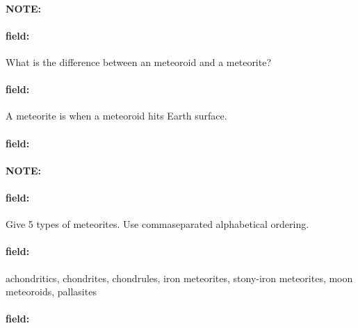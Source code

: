 \documentclass[12pt]{article}
\newenvironment{note}{\paragraph{NOTE:}}{}
\newenvironment{field}{\paragraph{field:}}{}
\begin{document}
\begin{note}
   \begin{field}
       What is the difference between an meteoroid and a meteorite?
   \end{field}
   \begin{field}
		A meteorite is when a meteoroid hits Earth surface.
   \end{field}
   \begin{field}
   \end{field}
\end{note}

\begin{note}
   \begin{field}
       Give 5 types of meteorites. Use commaseparated alphabetical ordering.
   \end{field}
   \begin{field}
		achondritics, chondrites, chondrules, iron meteorites, stony-iron meteorites, moon meteoroids, pallasites
   \end{field}
   \begin{field}
   \end{field}
\end{note}
\end{document}

